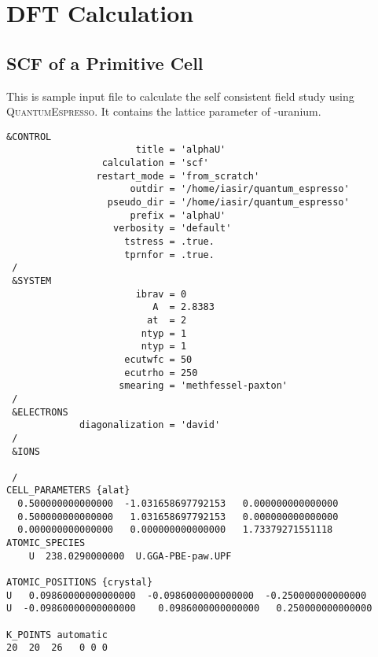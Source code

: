 \section{DFT Calculation}
\subsection{SCF of a Primitive Cell}
This is sample input file to calculate the self consistent field study using \textsc{QuantumEspresso}. It contains the lattice parameter of \textalpha-uranium.
\lstset{style=deflt}
\begin{lstlisting}
&CONTROL
                       title = 'alphaU'
                 calculation = 'scf'
                restart_mode = 'from_scratch'
                      outdir = '/home/iasir/quantum_espresso'
                  pseudo_dir = '/home/iasir/quantum_espresso'
                      prefix = 'alphaU'
                   verbosity = 'default'
                     tstress = .true.
                     tprnfor = .true.
 /
 &SYSTEM
                       ibrav = 0 
                          A  = 2.8383
                         at  = 2 
                        ntyp = 1 
                        ntyp = 1 
                     ecutwfc = 50
                     ecutrho = 250 
                    smearing = 'methfessel-paxton'
 /
 &ELECTRONS
             diagonalization = 'david'
 /
 &IONS

 /
CELL_PARAMETERS {alat}
  0.500000000000000  -1.031658697792153   0.000000000000000 
  0.500000000000000   1.031658697792153   0.000000000000000 
  0.000000000000000   0.000000000000000   1.73379271551118
ATOMIC_SPECIES
    U  238.0290000000  U.GGA-PBE-paw.UPF

ATOMIC_POSITIONS {crystal}
U   0.09860000000000000  -0.0986000000000000  -0.250000000000000 
U  -0.09860000000000000    0.0986000000000000   0.250000000000000  

K_POINTS automatic
20  20  26   0 0 0 

\end{lstlisting}

\pagebreak
